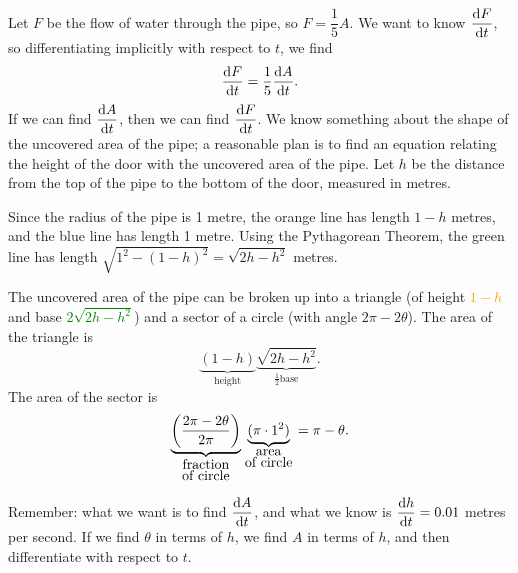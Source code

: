 \begin{solution}
Let $F$ be the flow of water through the pipe, so $F=\dfrac{1}{5}A$. We want to know $\ds\diff{F}{t}$, so differentiating implicitly with respect to $t$, we find
\[\ds\diff{F}{t}=\frac{1}{5}\ds\diff{A}{t}.\]
If we can find $\ds\diff{A}{t}$, then we can find $\ds\diff{F}{t}$. We know something about the shape of the uncovered area of the pipe; a reasonable plan is to find an equation relating the height of the door with the uncovered area of the pipe. Let $h$ be the distance from the top of the pipe to the bottom of the door, measured in metres.

\begin{center}\end{center}


Since the radius of the pipe is 1 metre, the orange line has length $1-h$ metres, and the blue line has length 1 metre. Using the Pythagorean Theorem, the green line has length $\sqrt{1^2-(1-h)^2}=\sqrt{2h-h^2}$ metres.

The uncovered area of the pipe can be broken up into a triangle (of height \textcolor{orange}{$1-h$} and base \textcolor{green}{$2\sqrt{2h-h^2}$}) and a sector of a circle (with angle $2\pi-2\theta$). The area of the triangle is \[\underbrace{(1-h)}_{\mbox{height}}\underbrace{\sqrt{2h-h^2}}_{\frac{1}{2}\mbox{base}}.\] The area of the sector is
\[\underbrace{\left(\frac{2\pi-2\theta}{2\pi}\right)}_{\atp{\mbox{fraction}}{\mbox{of circle}}}
\underbrace{(\pi\cdot 1^2)}_{
\atp{\mbox{area}
}{\mbox{of circle}
}}
=\pi-\theta.\]

Remember: what we want is to find $\ds\diff{A}{t}$, and what we know is
$\ds\diff{h}{t}=0.01$ metres per second.
If we find $\theta$ in terms of $h$, we find $A$ in terms of $h$, and then differentiate with respect to $t$.


\end{solution}
